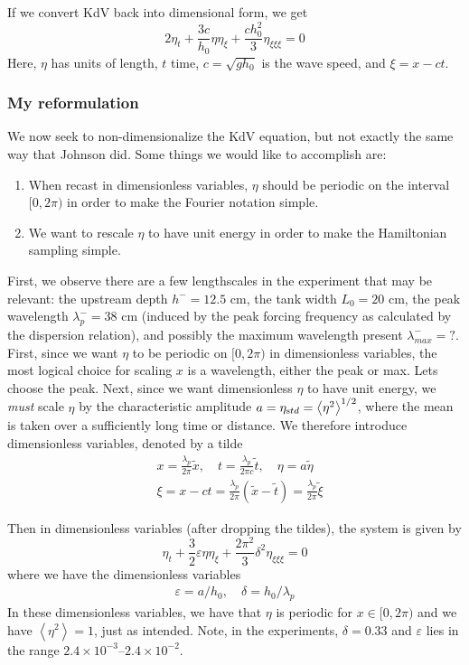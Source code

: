 \documentclass[12pt]{article}
\newcommand{\mean}[1]{\left< #1 \right>}
\newcommand{\eps}{\varepsilon}
\newcommand{\etastd}{\eta_{\text std}}
\begin{document}
If we convert KdV back into dimensional form, we get
\begin{equation}
2 \eta_t + \frac{3 c}{h_0} \eta \eta_{\xi} + \frac{c h_0^2}{3} \eta_{\xi \xi \xi} = 0
\end{equation}
Here, $\eta$ has units of length, $t$ time, $c = \sqrt{g h_0}$ is the wave speed, and $\xi = x - ct$.

\subsubsection{My reformulation}

We now seek to non-dimensionalize the KdV equation, but not exactly the same way that Johnson did. Some things we would like to accomplish are:
\begin{enumerate}
\item When recast in dimensionless variables, $\eta$ should be periodic on the interval $[0, 2\pi)$ in order to make the Fourier notation simple.
\item We want to rescale $\eta$ to have unit energy in order to make the Hamiltonian sampling simple.
\end{enumerate}
First, we observe there are a few lengthscales in the experiment that may be relevant: the upstream depth $h^- = 12.5$ cm, the tank width $L_0 = 20$ cm, the peak wavelength $\lambda_p^- = 38$ cm (induced by the peak forcing frequency as calculated by the dispersion relation), and possibly the maximum wavelength present $\lambda_{max}^{-} = ?$. First, since we want $\eta$ to be periodic on $[0,2 \pi)$ in dimensionless variables, the most logical choice for scaling $x$ is a wavelength, either the peak or max. Lets choose the peak. Next, since we want dimensionless $\eta$ to have unit energy, we {\em must} scale $\eta$ by the characteristic amplitude $a = \etastd = \mean{\eta^2}^{1/2}$, where the mean is taken over a sufficiently long time or distance. We therefore introduce dimensionless variables, denoted by a tilde
\begin{align}
& x = \frac{\lambda_p}{2\pi} \tilde{x} , \quad 
t = \frac{\lambda_p}{2\pi c} \tilde{t} , \quad
\eta = a \tilde{\eta} \\
& \xi = x-ct = \frac{\lambda_p}{2\pi} (\tilde{x} - \tilde{t}) = \frac{\lambda_p}{2\pi} \tilde{\xi}
\end{align}

Then in dimensionless variables (after dropping the tildes), the system is given by
\begin{equation}
\eta_t + \frac{3}{2}\eps \eta \eta_{\xi} + \frac{2 \pi^2}{3} \delta^2 \eta_{\xi \xi \xi} = 0
\end{equation}
where we have the dimensionless variables
\begin{align}
\eps = a/h_0 , \quad \delta = h_0/\lambda_p
\end{align}
In these dimensionless variables, we have that $\eta$ is periodic for $x \in [0, 2\pi)$ and we have $\mean{\eta^2} = 1$, just as intended.
Note, in the experiments, $\delta = 0.33$ and $\eps$ lies in the range $2.4 \times 10^{-3}$--$2.4 \times 10^{-2}$. 
\end{document}
